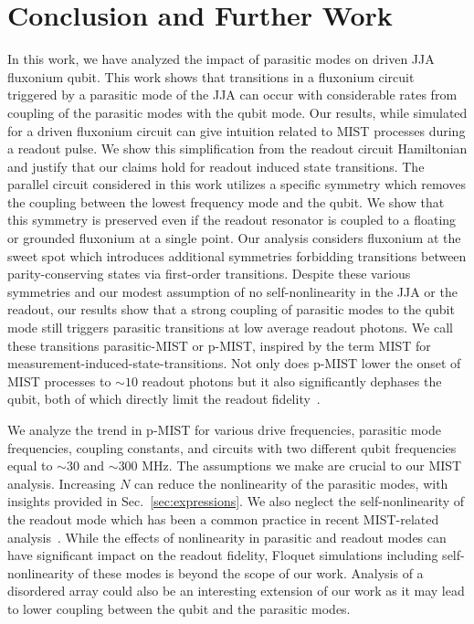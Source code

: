 \documentclass[%
reprint,
superscriptaddress,
 amsmath,amssymb,
 aps,
 prx,
longbibliography,
floatfix,
]{revtex4-2}
\begin{document}
\section{Conclusion and Further Work}\label{sec:conclusion}
In this work, we have analyzed the impact of parasitic modes on driven JJA fluxonium qubit. This work shows that transitions in a fluxonium circuit triggered by a parasitic mode of the JJA can occur with considerable rates from coupling of the parasitic modes with the qubit mode. Our results, while simulated for a driven fluxonium circuit can give intuition related to MIST processes during a readout pulse. We show this simplification from the readout circuit Hamiltonian and justify that our claims hold for readout induced state transitions. The parallel circuit considered in this work utilizes a specific symmetry which removes the coupling between the lowest frequency mode and the qubit. We show that this symmetry is preserved even if the readout resonator is coupled to a floating or grounded fluxonium at a single point. Our analysis considers fluxonium at the sweet spot which introduces additional symmetries forbidding transitions between parity-conserving states via first-order transitions. Despite these various symmetries and our modest assumption of no self-nonlinearity in the JJA or the readout, our results show that a strong coupling of parasitic modes to the qubit mode still triggers parasitic transitions at low average readout photons. We call these transitions parasitic-MIST or p-MIST, inspired by the term MIST for measurement-induced-state-transitions. Not only does p-MIST lower the onset of MIST processes to $\sim 10$ readout photons but it also significantly dephases the qubit, both of which directly limit the readout fidelity~\cite{hazra2024benchmarking}. 


We analyze the trend in p-MIST for various drive frequencies, parasitic mode frequencies, coupling constants, and circuits with two different qubit frequencies equal to $\sim 30$ and $\sim 300$ MHz. The assumptions we make are crucial to our MIST analysis. Increasing $N$ can reduce the nonlinearity of the parasitic modes, with insights provided in Sec.~\ref{sec:expressions}. We also neglect the self-nonlinearity of the readout mode which has been a common practice in recent MIST-related analysis~\cite{shillito2022dynamics,dumas2024unified,cohen2023reminiscence}. While the effects of nonlinearity in parasitic and readout modes can have significant impact on the readout fidelity, Floquet simulations including self-nonlinearity of these modes is beyond the scope of our work. Analysis of a disordered array could also be an interesting extension of our work as it may lead to lower coupling between the qubit and the parasitic modes. 
\end{document}
